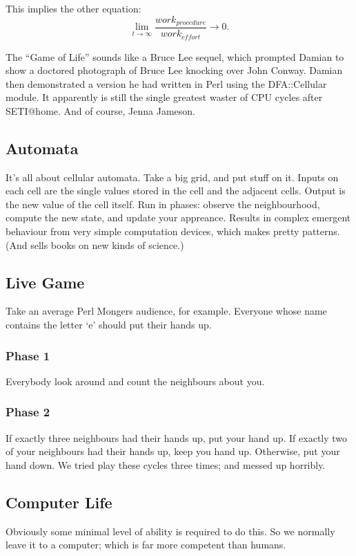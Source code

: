 \documentclass{article}
\begin{document}
This implies the other equation:
\[\lim_{t\rightarrow\infty}
  \frac{\mathit{work}_\mathit{procedure}}{\mathit{work}_\mathit{effort}} 
  \rightarrow 0.\]

The ``Game of Life'' sounds like a Bruce Lee sequel, which prompted
Damian to show a doctored photograph of Bruce Lee knocking over John
Conway.  Damian then demonstrated a version he had written in Perl using
the DFA::Cellular module.  It apparently is still the single greatest
waster of CPU cycles after SETI@home.  And of course, Jenna Jameson.

\subsection{Automata}
It's all about cellular automata.  Take a big grid, and put stuff on it.
Inputs on each cell are the single values stored in the cell and the
adjacent cells.  Output is the new  value of the cell itself.  Run in
phases: observe the neighbourhood, compute the new state, and update
your appreance.  Results in complex emergent behaviour from very simple
computation devices, which makes pretty patterns.  (And sells books on
new kinds of science.)

\subsection{Live Game}
Take an average Perl Mongers audience, for example.  Everyone whose name
contains the letter `e' should put their hands up.

\subsubsection{Phase 1}
Everybody look around and count the neighbours about you.

\subsubsection{Phase 2}
If exactly three neighbours had their hands up, put your hand up.
If exactly two of your neighbours had their hands up, keep you hand up.
Otherwise, put your hand down.  We tried play these cycles three times;
and messed up horribly.

\subsection{Computer Life}
Obviously some minimal level of ability is required to do this.  So we
normally leave it to a computer; which is far more competent than
humans.
\end{document}
